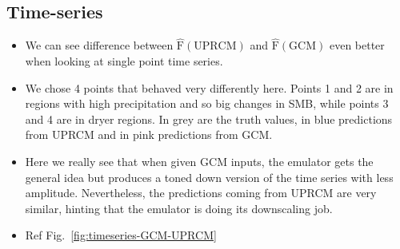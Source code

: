 \documentclass[a4paper,11pt,oneside]{report}
\begin{document}
\subsection{Time-series}
\begin{itemize}
    \item We can see difference between $\operatorname{\hat{F}(UPRCM)}$ and $\operatorname{\hat{F}(GCM)}$ even better when looking at single point time series. 
    \item We chose 4 points that behaved very differently here. Points 1 and 2 are in regions with high precipitation and so big changes in SMB, while points 3 and 4 are in dryer regions. In grey are the truth values, in blue predictions from UPRCM and in pink predictions from GCM. 
    \item Here we really see that when given GCM inputs, the emulator gets the general idea but produces a toned down version of the time series with less amplitude. Nevertheless, the predictions coming from UPRCM are very similar, hinting that the emulator is doing its downscaling job.
    \item Ref Fig.~\ref{fig:timeseries-GCM-UPRCM}
\end{itemize}
\end{document}

